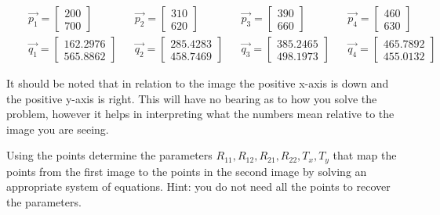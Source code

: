 \documentclass[11pt]{article}
\begin{document}
\begin{align} &&\vec{p_1}=\begin{bmatrix} 200 \\ 700 \end{bmatrix} &&\vec{p_2}=\begin{bmatrix} 310 \\ 620 \end{bmatrix} &&\vec{p_3}=\begin{bmatrix} 390 \\ 660 \end{bmatrix} &&\vec{p_4}=\begin{bmatrix} 460 \\ 630 \end{bmatrix}\\ &&\vec{q_1}=\begin{bmatrix} 162.2976 \\ 565.8862 \end{bmatrix} &&\vec{q_2}=\begin{bmatrix} 285.4283 \\ 458.7469 \end{bmatrix} &&\vec{q_3}=\begin{bmatrix} 385.2465 \\ 498.1973 \end{bmatrix} &&\vec{q_4}=\begin{bmatrix} 465.7892 \\ 455.0132 \end{bmatrix} \end{align}

It should be noted that in relation to the image the positive x-axis is
down and the positive y-axis is right. This will have no bearing as to
how you solve the problem, however it helps in interpreting what the
numbers mean relative to the image you are seeing.

Using the points determine the parameters
\(R_{11},R_{12},R_{21},R_{22},T_x,T_y\) that map the points from the
first image to the points in the second image by solving an appropriate
system of equations. Hint: you do not need all the points to recover the
parameters.
\end{document}
